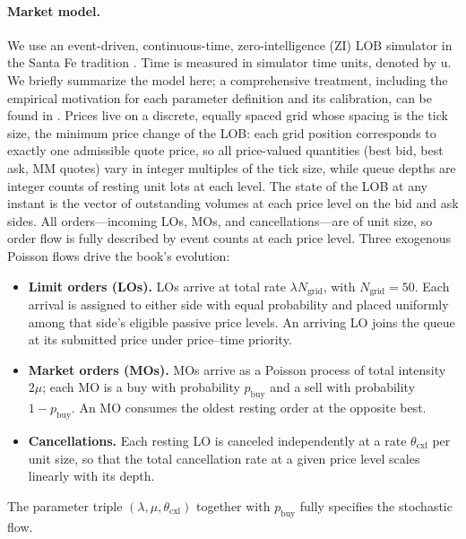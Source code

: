\documentclass[11pt,a4paper]{article}
\begin{document}
\paragraph{Market model.}
We use an event-driven, continuous-time, zero-intelligence (ZI) LOB
simulator in the Santa Fe tradition
\citep{smith2003,farmer2005predictive}.
Time is measured in simulator time units, denoted by $\mathrm{u}$.
We briefly summarize the
model here; a comprehensive treatment, including the
empirical motivation for each parameter definition and its calibration, can be found in
\citet{bouchaud2018trades}.  Prices live on a discrete,
equally spaced grid whose spacing is the tick size, the minimum
price change of the LOB: each grid position corresponds to exactly
one admissible quote price, so all price-valued quantities (best
bid, best ask, MM quotes) vary in integer multiples of the tick
size, while queue depths are integer counts of resting unit lots at
each level.  The state of the LOB at any instant is the vector of
outstanding volumes at each price level on the bid and ask sides.
All orders---incoming LOs, MOs, and cancellations---are of unit size,
so order flow is fully described by event counts at each price level.
Three exogenous Poisson flows drive the book's evolution:
\begin{itemize}[leftmargin=1.2em,itemsep=1pt,topsep=2pt]
\item \textbf{Limit orders (LOs).} LOs arrive at total rate
  $\lambda N_{\mathrm{grid}}$, with $N_{\mathrm{grid}}=50$.
  Each arrival is assigned to either side with equal probability
  and placed uniformly among that side's eligible passive price
  levels. An arriving LO joins
  the queue at its submitted price under price--time priority.
\item \textbf{Market orders (MOs).} MOs arrive as a Poisson process of
  total intensity $2\mu$; each MO is a buy with probability
  $p_{\mathrm{buy}}$ and a sell with probability $1-p_{\mathrm{buy}}$.
  An MO consumes the oldest resting order at the opposite best.

\item \textbf{Cancellations.}  Each resting LO is canceled
 independently at a rate $\theta_{\mathrm{cxl}}$ per unit size, so that the total
   cancellation rate at a given price level scales linearly with its
  depth.
\end{itemize}
The parameter triple $(\lambda, \mu, \theta_{\mathrm{cxl}})$ together with
$p_{\mathrm{buy}}$ fully specifies the stochastic flow.
\end{document}
